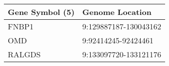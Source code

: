 \begin{tabular}{ll}
\toprule
Gene Symbol (5) &       Genome Location \\
\midrule
          FNBP1 & 9:129887187-130043162 \\
            OMD &   9:92414245-92424461 \\
         RALGDS & 9:133097720-133121176 \\
\bottomrule
\end{tabular}

